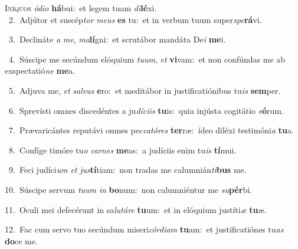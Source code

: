 \lettrine{\initial\textcolor{\initialcolor}{I}}{níquos} \textit{ó}\-\textit{di}\textit{o} \textbf{há}\-bui:~\star et legem tuam \textit{di}\-\textbf{lé}xi.\\
{\numbfont\textcolor{\numbcolor}{~2.}}~Adjútor et suscép\textit{tor} \textit{me}\-\textit{us} \textbf{es} tu:~\star et in verbum tuum super\-\textit{spe}\-\textbf{rá}vi.\par
{\numbfont\textcolor{\numbcolor}{~3.}}~Declináte \textit{a} \textit{me}\-, \textit{ma}\-\textbf{lí}gni:~\star et scrutábor mandáta De\textit{i} \textbf{me}\-i.\par
{\numbfont\textcolor{\numbcolor}{~4.}}~Súscipe me secúndum elóquium \textit{tu}\-\textit{um}, \textit{et} \textbf{vi}\-vam:~\star et non confúndas me ab exspectatió\textit{ne} \textbf{me}\-a.\par
{\numbfont\textcolor{\numbcolor}{~5.}}~Adjuva me, \textit{et} \textit{sal}\-\textit{vus} \textbf{e}\-ro:~\star et meditábor in justificatiónibus tu\textit{is} \textbf{sem}\-per.\par
{\numbfont\textcolor{\numbcolor}{~6.}}~Sprevísti omnes discedéntes a ju\-\textit{dí}\-\textit{ci}\textit{is} \textbf{tu}\-is:~\star quia injústa cogitátio \textit{e}\-\textbf{ó}rum.\par
{\numbfont\textcolor{\numbcolor}{~7.}}~Prævaricántes reputávi omnes pec\-\textit{ca}\-\textit{tó}\textit{res} \textbf{ter}\-ræ:~\star ídeo diléxi testimóni\textit{a} \textbf{tu}\-a.\par
{\numbfont\textcolor{\numbcolor}{~8.}}~Confíge timóre tu\textit{o} \textit{car}\-\textit{nes} \textbf{me}\-as:~\star a judíciis enim tu\textit{is} \textbf{tí}\-mui.\par
{\numbfont\textcolor{\numbcolor}{~9.}}~Feci judíci\textit{um} \textit{et} \textit{jus}\-\textbf{tí}tiam:~\star non tradas me calumnián\-\textit{ti}\-\textbf{bus} me.\par
{\numbfont\textcolor{\numbcolor}{10.}}~Súscipe servum \textit{tu}\-\textit{um} \textit{in} \textbf{bo}\-num:~\star non calumniéntur me \textit{su}\-\textbf{pér}bi.\par
{\numbfont\textcolor{\numbcolor}{11.}}~Oculi mei defecérunt in sa\-\textit{lu}\-\textit{tá}\textit{re} \textbf{tu}\-um:~\star et in elóquium justíti\textit{æ} \textbf{tu}\-æ.\par
{\numbfont\textcolor{\numbcolor}{12.}}~Fac cum servo tuo secúndum miseri\-\textit{cór}\-\textit{di}\textit{am} \textbf{tu}\-am:~\star et justificatiónes tu\textit{as} \textbf{do}\-ce me.\par
